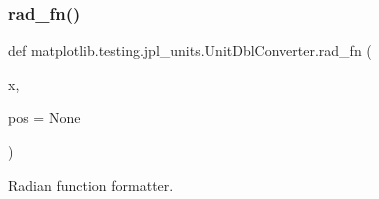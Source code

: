 \subsubsection{\texorpdfstring{rad\+\_\+fn()}{rad\_fn()}}
{\footnotesize\ttfamily def matplotlib.\+testing.\+jpl\+\_\+units.\+Unit\+Dbl\+Converter.\+rad\+\_\+fn (\begin{DoxyParamCaption}\item[{}]{x,  }\item[{}]{pos = {\ttfamily None} }\end{DoxyParamCaption})}

\begin{DoxyVerb}Radian function formatter.\end{DoxyVerb}
 